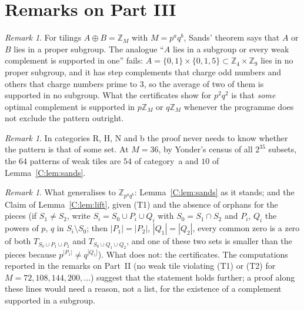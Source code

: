 \documentclass[11pt,a4paper]{amsart}
\theoremstyle{definition}
\theoremstyle{remark}
\newtheorem{remark}[theorem]{Remark}
\newcommand{\Z}{\mathbb{Z}}
\begin{document}
\section{Remarks on Part III}

\begin{remark}\label{C:rem:sands}
For tilings $A\oplus B=\Z_M$ with $M=p^aq^b$, Sands' theorem says that $A$ or $B$ lies in a proper subgroup. The
analogue ``$A$ lies in a subgroup or every weak complement is supported in one'' fails: $A=\{0,1\}\times\{0,1,5\}
\subset\Z_4\times\Z_9$ lies in no proper subgroup, and it has step complements that charge odd numbers and
others that charge numbers prime to $3$, so the average of two of them is supported in no subgroup. What the
certificates show for $p^2q^2$ is that \emph{some} optimal complement is supported in $p\Z_M$ or $q\Z_M$ whenever
the programme does not exclude the pattern outright.
\end{remark}

\begin{remark}
In categories R, H, N and b the proof never needs to know whether the pattern is that of some set. At $M=36$,
by Yonder's census of all $2^{35}$ subsets, the $64$ patterns of weak tiles are $54$ of category~a and $10$ of
Lemma~\ref{C:lem:sands}.
\end{remark}

\begin{remark}
What generalises to $\Z_{p^aq^b}$: Lemma~\ref{C:lem:sands} as it stands; and the Claim of Lemma~\ref{C:lem:lift},
given (T1) and the absence of orphans for the pieces (if $S_1\ne S_2$, write $S_i=S_0\cup P_i\cup Q_i$ with
$S_0=S_1\cap S_2$ and $P_i$, $Q_i$ the powers of $p$, $q$ in $S_i\setminus S_0$; then $|P_1|=|P_2|$,
$|Q_1|=|Q_2|$, every common zero is a zero of both $T_{S_0\cup P_1\cup P_2}$ and $T_{S_0\cup Q_1\cup Q_2}$, and
one of these two sets is smaller than the pieces because $p^{|P_1|}\ne q^{|Q_1|}$). What does not: the
certificates. The computations reported in the remarks on Part~II (no weak tile violating (T1) or (T2) for $M=72,108,144,200,\dots$)
suggest that the statement holds further; a proof along these lines would need a reason, not a list, for the
existence of a complement supported in a subgroup.
\end{remark}
\end{document}
